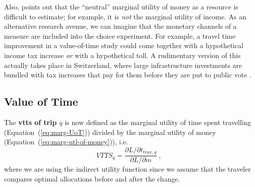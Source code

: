 Also, \cite{Small2012ValuationOfTimeRevisited} points out that the ``neutral'' marginal utility of money as a resource is difficult to estimate; for example, it is \emph{not} the marginal utility of income.  
  As an alternative research avenue, we can imagine that the monetary channels of a measure are included into the choice experiment.  For example, a travel time improvement in a value-of-time study could come together with a hypothetical income tax increase \emph{or} with a hypothetical toll.  A rudimentary version of this actually takes place in Switzerland, where large infrastructure investments are bundled with tax increases that pay for them before they are put to public vote \citep[see, e.g.,][]{BAV2013FinanzierungFABI}.







\subsection{Value of Time}

The \textbf{\gls{vtts} of trip $q$} is now defined as the marginal utility of time spent travelling (Equation~(\ref{eq:marg-UoT})) divided by the marginal utility of money (Equation~(\ref{eq:marg-utl-of-money})), i.e.
%
\begin{equation}
VTTS_q = \frac{\partial L/\partial t_{trav,q}}{\partial L/\partial m} \ ,
\label{eq:vot}
\end{equation}
where we are using the indirect utility function 
since we assume that the traveler compares optimal allocations before and after the change.

